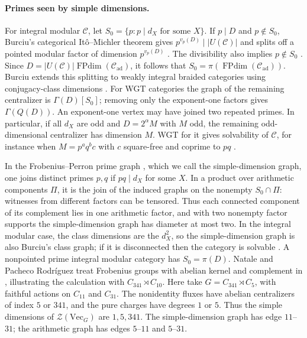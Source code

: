 \documentclass[11pt,a4paper]{article}
\numberwithin{equation}{section}
\theoremstyle{remark}
\newcommand{\C}{\mathcal C}
\renewcommand{\Vec}{\mathrm{Vec}}
\newcommand{\FPdim}{\operatorname{FPdim}}
\newcommand{\ad}{\mathrm{ad}}
\begin{document}
\paragraph{Primes seen by simple dimensions.}
For integral modular $\C$, let $S_0=\{p:p\mid d_X\text{ for some }X\}$.
If $p\mid D$ and $p\notin S_0$, Burciu's categorical It\^o--Michler theorem
gives $p^{v_p(D)}\mid |U(\C)|$ and splits off a pointed modular factor of
dimension $p^{v_p(D)}$ \cite[Proposition~1.3]{BurciuIM}. The divisibility
also implies $p\notin S_0$ \cite[Corollary~1.7]{BurciuIsaacs}. Since
$D=|U(\C)|\FPdim(\C_{\ad})$, it follows that
$S_0=\pi(\FPdim(\C_{\ad}))$. Burciu extends this splitting to weakly integral braided categories using conjugacy-class dimensions \cite[Theorem~1.1]{BurciuClassGraph}. For WGT categories the graph of
the remaining centralizer is $\Gamma(D)[S_0]$; removing only the
exponent-one factors gives $\Gamma(Q(D))$. An exponent-one vertex may
have joined two repeated primes. In particular, if all $d_X$ are odd
and $D=2^\alpha M$ with $M$ odd, the remaining odd-dimensional
centralizer has dimension $M$. WGT for it gives solvability of
$\C$, for instance when $M=p^a q^b c$ with $c$ square-free and
coprime to $pq$ \cite[Theorem~7.4]{NataleWGT}.

In the Frobenius--Perron prime graph \cite[Definitions~2.1 and~4.1]{NP}, which we call the simple-dimension graph, one joins distinct primes $p,q$ if
$pq\mid d_X$ for some $X$. In a product over arithmetic components
$\Pi$, it is the join of the induced graphs on the nonempty
$S_0\cap\Pi$: witnesses from different factors can be tensored.
Thus each connected component of its complement lies in one
arithmetic factor, and with two nonempty factor supports the
simple-dimension graph has diameter at most two. In the integral modular case, the class dimensions are the $d_X^2$, so the simple-dimension graph is also Burciu's class graph; if it is disconnected then the category is solvable \cite[Theorem~1.2 and Lemma~6.2(1)]{BurciuClassGraph}. A nonpointed
prime integral modular category has $S_0=\pi(D)$.
Natale and Pacheco Rodr\'iguez treat Frobenius groups with abelian kernel and complement in \cite[Example~8.6]{NP}, illustrating the calculation with $C_{341}\rtimes C_{10}$. Here take $G=C_{341}\rtimes C_5$, with faithful actions on $C_{11}$ and $C_{31}$. The nonidentity fluxes have abelian centralizers of index $5$ or $341$, and the pure charges have degrees $1$ or $5$. Thus the simple dimensions of $\mathcal Z(\Vec_G)$ are $1,5,341$. The simple-dimension graph has edge
$11$--$31$; the arithmetic graph has edges $5$--$11$ and $5$--$31$.
\end{document}
